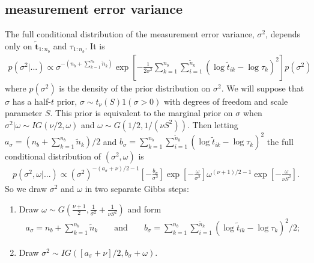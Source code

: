 \documentclass{article}
\begin{document}
\subsection{measurement error variance}
The full conditional distribution of the measurement error variance, $\sigma^2$, depends only on $\tilde{\bm{t}}_{1:n_{b}}$ and $\tau_{1:n_{b}}$. It is
\begin{align*}
p(\sigma^2|...) \propto \sigma^{-(n_{b} + \sum_{k=1}^{n_{b}}\tilde{n}_k)}\exp\left[-\frac{1}{2\sigma^2}\sum_{k=1}^{n_{b}}\sum_{i=1}^{\tilde{n}_k}(\log \tilde{t}_{ik} - \log\tau_k)^2\right]p(\sigma^2)
\end{align*}
where $p(\sigma^2)$ is the density of the prior distribution on $\sigma^2$. We will suppose that $\sigma$ has a half-$t$ prior, $\sigma \sim t_\nu(S)1(\sigma>0)$ with degrees of freedom and scale parameter $S$. This prior is equivalent to the marginal prior on $\sigma$ when $\sigma^2|\omega \sim IG(\nu/2, \omega)$ and $\omega \sim G(1/2, 1/(\nu S^2))$. Then letting $a_\sigma = (n_{b} + \sum_{k=1}^{n_b}\tilde{n}_k)/2$ and $b_\sigma = \sum_{k=1}^{n_{b}}\sum_{i=1}^{\tilde{n}_k}(\log \tilde{t}_{ik} - \log\tau_k)^2$ the full conditional distribution of $(\sigma^2,\omega)$ is
\begin{align*}
p(\sigma^2,\omega|...) \propto (\sigma^2)^{-(a_\sigma+\nu)/2-1}\left[-\frac{b_\sigma}{\sigma^2}\right]\exp\left[-\frac{\omega}{\sigma^2}\right]\omega^{(\nu + 1)/2 - 1}\exp\left[-\frac{\omega}{\nu S^2}\right].
\end{align*}
So we draw $\sigma^2$ and $\omega$ in two separate Gibbs steps:
\begin{enumerate}
\item Draw $\omega \sim G\left(\frac{\nu + 1}{2}, \frac{1}{\sigma^2} + \frac{1}{\nu S^2}\right)$ and form
\begin{align*}
a_\sigma = n_{b} + \sum_{k=1}^{n_b}\tilde{n}_k &&\mbox{  and  }&& b_\sigma = \sum_{k=1}^{n_{b}}\sum_{i=1}^{\tilde{n}_k}(\log \tilde{t}_{ik} - \log\tau_k)^2/2;
\end{align*}
\item Draw $\sigma^2 \sim  IG([a_\sigma + \nu]/2, b_\sigma + \omega)$.
\end{enumerate}
\end{document}
